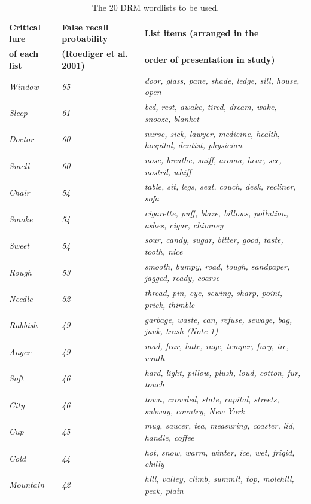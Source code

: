\documentclass[
]{article}
\begin{document}
\begin{table}[H]

\caption{\label{tab:table2}The 20 DRM wordlists to be used.}
\centering
\begin{tabular}[t]{lll}
\toprule
\textbf{Critical lure} & \textbf{False recall probability} & \textbf{List items (arranged in the}\\
\textbf{of each list} & \textbf{(Roediger et al. 2001)} & \textbf{order of presentation in study)}\\
\midrule
\em{Window} & \em{65} & \em{door, glass, pane, shade, ledge, sill, house, open}\\
\em{Sleep} & \em{61} & \em{bed, rest, awake, tired, dream, wake, snooze, blanket}\\
\em{Doctor} & \em{60} & \em{nurse, sick, lawyer, medicine, health, hospital, dentist, physician}\\
\addlinespace
\em{Smell} & \em{60} & \em{nose, breathe, sniff, aroma, hear, see, nostril, whiff}\\
\em{Chair} & \em{54} & \em{table, sit, legs, seat, couch, desk, recliner, sofa}\\
\em{Smoke} & \em{54} & \em{cigarette, puff, blaze, billows, pollution, ashes, cigar, chimney}\\
\em{Sweet} & \em{54} & \em{sour, candy, sugar, bitter, good, taste, tooth, nice}\\
\em{Rough} & \em{53} & \em{smooth, bumpy, road, tough, sandpaper, jagged, ready, coarse}\\
\addlinespace
\em{Needle} & \em{52} & \em{thread, pin, eye, sewing, sharp, point, prick, thimble}\\
\em{Rubbish} & \em{49} & \em{garbage, waste, can, refuse, sewage, bag, junk, trash (Note 1)}\\
\em{Anger} & \em{49} & \em{mad, fear, hate, rage, temper, fury, ire, wrath}\\
\em{Soft} & \em{46} & \em{hard, light, pillow, plush, loud, cotton, fur, touch}\\
\em{City} & \em{46} & \em{town, crowded, state, capital, streets, subway, country, New York}\\
\addlinespace
\em{Cup} & \em{45} & \em{mug, saucer, tea, measuring, coaster, lid, handle, coffee}\\
\em{Cold} & \em{44} & \em{hot, snow, warm, winter, ice, wet, frigid, chilly}\\
\em{Mountain} & \em{42} & \em{hill, valley, climb, summit, top, molehill, peak, plain}\\

\end{tabular}
\end{table}
\end{document}
